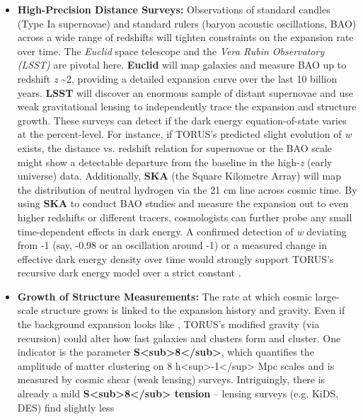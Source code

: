 \documentclass[
]{article}
\begin{document}
\begin{itemize}
\item
  \textbf{High-Precision Distance Surveys:} Observations of standard
  candles (Type Ia supernovae) and standard rulers (baryon acoustic
  oscillations, BAO) across a wide range of redshifts will tighten
  constraints on the expansion rate over time. The \emph{Euclid} space
  telescope and the \emph{Vera Rubin Observatory (LSST)} are pivotal
  here. \textbf{Euclid} will map galaxies and measure BAO up to redshift
  \emph{z} \textasciitilde2, providing a detailed expansion curve over
  the last 10 billion years. \textbf{LSST} will discover an enormous
  sample of distant supernovae and use weak gravitational lensing to
  independently trace the expansion and structure growth. These surveys
  can detect if the dark energy equation-of-state varies at the
  percent-level. For instance, if TORUS's predicted slight evolution of
  \emph{w} exists, the distance vs. redshift relation for supernovae or
  the BAO scale might show a detectable departure from the \LambdaCDM baseline
  in the high-\emph{z} (early universe) data\hspace{0pt}. Additionally,
  \textbf{SKA} (the Square Kilometre Array) will map the distribution of
  neutral hydrogen via the 21 cm line across cosmic time. By using
  \textbf{SKA} to conduct BAO studies and measure the expansion out to
  even higher redshifts or different tracers, cosmologists can further
  probe any small time-dependent effects in dark energy\hspace{0pt}. A
  confirmed detection of \emph{w} deviating from -1 (say, -0.98 or an
  oscillation around -1) or a measured change in effective dark energy
  density over time would strongly support TORUS's recursive dark energy
  model over a strict constant \Lambda.
\item
  \textbf{Growth of Structure Measurements:} The rate at which cosmic
  large-scale structure grows is linked to the expansion history and
  gravity. Even if the background expansion looks like \LambdaCDM, TORUS's
  modified gravity (via recursion) could alter how fast galaxies and
  clusters form and cluster. One indicator is the parameter
  \textbf{S\textless sub\textgreater8\textless/sub\textgreater{}}, which
  quantifies the amplitude of matter clustering on 8
  h\textless sup\textgreater-1\textless/sup\textgreater{} Mpc scales and
  is measured by cosmic shear (weak lensing) surveys. Intriguingly,
  there is already a mild
  \textbf{S\textless sub\textgreater8\textless/sub\textgreater{}
  tension} -- lensing surveys (e.g. KiDS, DES) find slightly less

\end{itemize}
\end{document}
